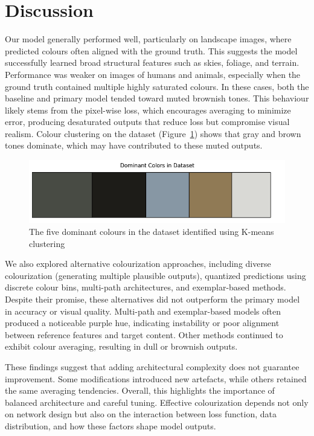 \documentclass{article} %
\begin{document}
\section{Discussion}
\label{discussion}

Our model generally performed well, particularly on landscape images, where predicted colours often aligned with the ground truth. This suggests the model successfully learned broad 
structural features such as skies, foliage, and terrain. Performance was weaker on images of humans and animals, especially when the ground truth contained multiple highly saturated 
colours. In these cases, both the baseline and primary model tended toward muted brownish tones. This behaviour likely stems from the pixel-wise loss, which encourages averaging to 
minimize error, producing desaturated outputs that reduce loss but compromise visual realism. Colour clustering on the dataset (Figure~\ref{fig:dom-colours}) shows that gray and brown 
tones dominate, which may have contributed to these muted outputs.

\begin{figure}[htbp]
  \centering
  \includegraphics[width=0.95\linewidth]{Figs/dom-colours.png}
  \caption{The five dominant colours in the dataset identified using K-means clustering}
  \label{fig:dom-colours}
\end{figure}

We also explored alternative colourization approaches, including diverse colourization (generating multiple plausible outputs), quantized predictions using discrete colour bins, 
multi-path architectures, and exemplar-based methods. Despite their promise, these alternatives did not outperform the primary model in accuracy or visual quality. Multi-path and 
exemplar-based models often produced a noticeable purple hue, indicating instability or poor alignment between reference features and target content. Other methods continued to exhibit 
colour averaging, resulting in dull or brownish outputs.

These findings suggest that adding architectural complexity does not guarantee improvement. Some modifications introduced new artefacts, while others retained the same averaging tendencies. 
Overall, this highlights the importance of balanced architecture and careful tuning. Effective colourization depends not only on network design but also on the interaction between loss 
function, data distribution, and how these factors shape model outputs.
\end{document}
